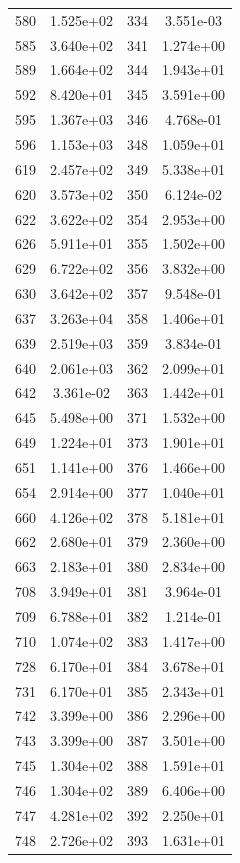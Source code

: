 \documentclass[12pt]{article}
\begin{document}
\begin{longtable}{@{}cccc@{}}
580 & 1.525e+02 & 334 & 3.551e-03 \\
585 & 3.640e+02 & 341 & 1.274e+00 \\
589 & 1.664e+02 & 344 & 1.943e+01 \\
592 & 8.420e+01 & 345 & 3.591e+00 \\
595 & 1.367e+03 & 346 & 4.768e-01 \\
596 & 1.153e+03 & 348 & 1.059e+01 \\
619 & 2.457e+02 & 349 & 5.338e+01 \\
620 & 3.573e+02 & 350 & 6.124e-02 \\
622 & 3.622e+02 & 354 & 2.953e+00 \\
626 & 5.911e+01 & 355 & 1.502e+00 \\
629 & 6.722e+02 & 356 & 3.832e+00 \\
630 & 3.642e+02 & 357 & 9.548e-01 \\
637 & 3.263e+04 & 358 & 1.406e+01 \\
639 & 2.519e+03 & 359 & 3.834e-01 \\
640 & 2.061e+03 & 362 & 2.099e+01 \\
642 & 3.361e-02 & 363 & 1.442e+01 \\
645 & 5.498e+00 & 371 & 1.532e+00 \\
649 & 1.224e+01 & 373 & 1.901e+01 \\
651 & 1.141e+00 & 376 & 1.466e+00 \\
654 & 2.914e+00 & 377 & 1.040e+01 \\
660 & 4.126e+02 & 378 & 5.181e+01 \\
662 & 2.680e+01 & 379 & 2.360e+00 \\
663 & 2.183e+01 & 380 & 2.834e+00 \\
708 & 3.949e+01 & 381 & 3.964e-01 \\
709 & 6.788e+01 & 382 & 1.214e-01 \\
710 & 1.074e+02 & 383 & 1.417e+00 \\
728 & 6.170e+01 & 384 & 3.678e+01 \\
731 & 6.170e+01 & 385 & 2.343e+01 \\
742 & 3.399e+00 & 386 & 2.296e+00 \\
743 & 3.399e+00 & 387 & 3.501e+00 \\
745 & 1.304e+02 & 388 & 1.591e+01 \\
746 & 1.304e+02 & 389 & 6.406e+00 \\
747 & 4.281e+02 & 392 & 2.250e+01 \\
748 & 2.726e+02 & 393 & 1.631e+01 \\

\end{longtable}
\end{document}
